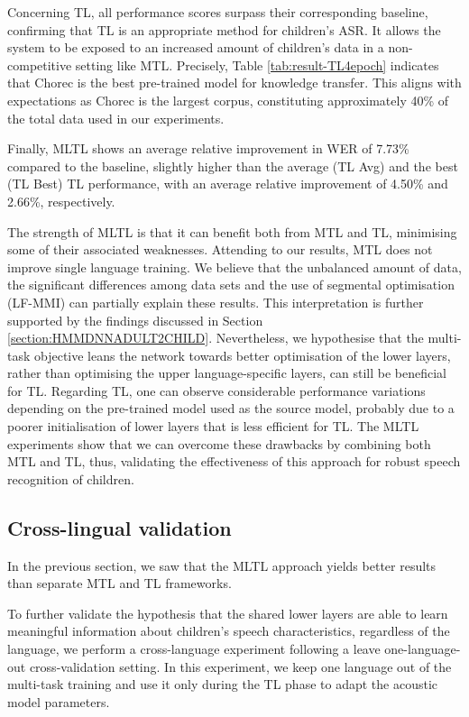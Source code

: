 Concerning \ac{TL}, all performance scores surpass their corresponding baseline, confirming that \ac{TL} is an appropriate method for children's \ac{ASR}. It allows the system to be exposed to an increased amount of children's data in a non-competitive setting like \ac{MTL}. Precisely, Table \ref{tab:result-TL4epoch} indicates that Chorec is the best pre-trained model for knowledge transfer. This aligns with expectations as Chorec is the largest corpus, constituting approximately 40\% of the total data used in our experiments.


Finally, \ac{MLTL} shows an average relative improvement in \ac{WER} of 7.73\%  compared to the baseline, slightly higher than the average (\ac{TL} Avg) and the best (\ac{TL} Best) \ac{TL} performance, with an average relative improvement of 4.50\% and 2.66\%, respectively. 

The strength of \ac{MLTL} is that it can benefit both from \ac{MTL} and \ac{TL}, minimising some of their associated weaknesses.
Attending to our results, \ac{MTL} does not improve single language training. We believe that the unbalanced amount of data, the significant differences among data sets and the use of segmental optimisation (\ac{LF-MMI}) can partially explain these results. This interpretation is further supported by the findings discussed in Section \ref{section:HMMDNNADULT2CHILD}. Nevertheless, we hypothesise that the multi-task objective leans the network towards 
better optimisation of the lower layers, rather than optimising the upper language-specific layers, can still be beneficial for \ac{TL}.
Regarding \ac{TL}, one can observe considerable performance variations depending on the pre-trained model used as the source model, probably due to a poorer initialisation of lower layers that is less efficient for \ac{TL}. The \ac{MLTL} experiments show that we can overcome these drawbacks by combining both \ac{MTL} and \ac{TL}, thus, validating the effectiveness of this approach for robust speech recognition of children.


\subsection{Cross-lingual validation}
\label{section:olo}

In the previous section, we saw that the \ac{MLTL} approach yields better results than separate \ac{MTL} and \ac{TL} frameworks.

To further validate the hypothesis that the shared lower layers are able to learn meaningful information about children's speech characteristics, regardless of the language, we perform a cross-language experiment following a leave one-language-out cross-validation setting. In this experiment, we keep one language out of the multi-task training and use it only during the \ac{TL} phase to adapt the acoustic model parameters. 

